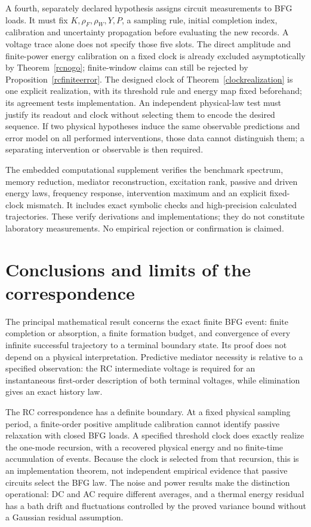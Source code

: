 \documentclass[11pt,letterpaper]{article}
\theoremstyle{definition}
\numberwithin{equation}{section}
\begin{document}
A fourth, separately declared hypothesis assigns circuit measurements to BFG loads. It must fix $K,\rho_F,\rho_W,Y,P$, a sampling rule, initial completion index, calibration and uncertainty propagation before evaluating the new records. A voltage trace alone does not specify those five slots. The direct amplitude and finite-power energy calibration on a fixed clock is already excluded asymptotically by Theorem~\ref{rcnogo}; finite-window claims can still be rejected by Proposition~\ref{rcfiniteerror}. The designed clock of Theorem~\ref{clockrealization} is one explicit realization, with its threshold rule and energy map fixed beforehand; its agreement tests implementation. An independent physical-law test must justify its readout and clock without selecting them to encode the desired sequence. If two physical hypotheses induce the same observable predictions and error model on all performed interventions, those data cannot distinguish them; a separating intervention or observable is then required.

The embedded computational supplement verifies the benchmark spectrum, memory reduction, mediator reconstruction, excitation rank, passive and driven energy laws, frequency response, intervention maximum and an explicit fixed-clock mismatch. It includes exact symbolic checks and high-precision calculated trajectories. These verify derivations and implementations; they do not constitute laboratory measurements. No empirical rejection or confirmation is claimed.

\section{Conclusions and limits of the correspondence}
The principal mathematical result concerns the exact finite BFG event: finite completion or absorption, a finite formation budget, and convergence of every infinite successful trajectory to a terminal boundary state. Its proof does not depend on a physical interpretation. Predictive mediator necessity is relative to a specified observation: the RC intermediate voltage is required for an instantaneous first-order description of both terminal voltages, while elimination gives an exact history law.

The RC correspondence has a definite boundary. At a fixed physical sampling period, a finite-order positive amplitude calibration cannot identify passive relaxation with closed BFG loads. A specified threshold clock does exactly realize the one-mode recursion, with a recovered physical energy and no finite-time accumulation of events. Because the clock is selected from that recursion, this is an implementation theorem, not independent empirical evidence that passive circuits select the BFG law. The noise and power results make the distinction operational: DC and AC require different averages, and a thermal energy residual has a bath drift and fluctuations controlled by the proved variance bound without a Gaussian residual assumption.
\end{document}
